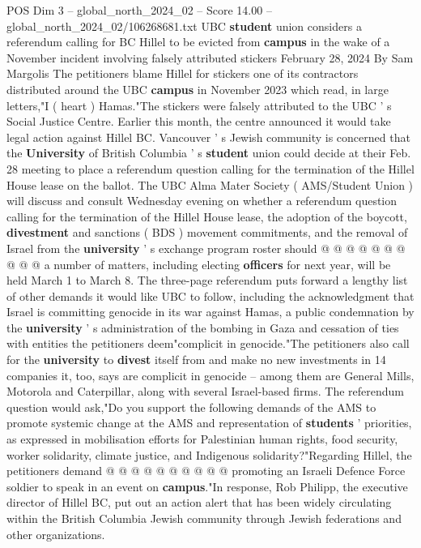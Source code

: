 \begin{textsample}{POS Dim 3 – global\_north\_2024\_02 – Score 14.00 – global\_north\_2024\_02/106268681.txt}  \label{ex:f3_pos_249}
UBC \textbf{student} union considers a referendum calling for BC Hillel to be evicted from \textbf{campus} in the wake of a November incident involving falsely attributed stickers February 28, 2024 By Sam Margolis The petitioners blame Hillel for stickers one of its contractors distributed around the UBC \textbf{campus} in November 2023 which read, in large letters,"I ( heart ) Hamas."The stickers were falsely attributed to the UBC ' s Social Justice Centre.
Earlier this month, the centre announced it would take legal action against Hillel BC.
Vancouver ' s Jewish community is concerned that the \textbf{University} of British Columbia ' s \textbf{student} union could decide at their Feb. 28 meeting to place a referendum question calling for the termination of the Hillel House lease on the ballot.
The UBC Alma Mater Society ( AMS/Student Union ) will discuss and consult Wednesday evening on whether a referendum question calling for the termination of the Hillel House lease, the adoption of the boycott, \textbf{divestment} and sanctions ( BDS ) movement commitments, and the removal of Israel from the \textbf{university} ' s exchange program roster should @ @ @ @ @ @ @ @ @ @ a number of matters, including electing \textbf{officers} for next year, will be held March 1 to March 8.
The three-page referendum puts forward a lengthy list of other demands it would like UBC to follow, including the acknowledgment that Israel is committing genocide in its war against Hamas, a public condemnation by the \textbf{university} ' s administration of the bombing in Gaza and cessation of ties with entities the petitioners deem"complicit in genocide."The petitioners also call for the \textbf{university} to \textbf{divest} itself from and make no new investments in 14 companies it, too, says are complicit in genocide -- among them are General Mills, Motorola and Caterpillar, along with several Israel-based firms.
The referendum question would ask,"Do you support the following demands of the AMS to promote systemic change at the AMS and representation of \textbf{students} ' priorities, as expressed in mobilisation efforts for Palestinian human rights, food security, worker solidarity, climate justice, and Indigenous solidarity?"Regarding Hillel, the petitioners demand @ @ @ @ @ @ @ @ @ @ promoting an Israeli Defence Force soldier to speak in an event on \textbf{campus}."In response, Rob Philipp, the executive director of Hillel BC, put out an action alert that has been widely circulating within the British Columbia Jewish community through Jewish federations and other organizations.

\end{textsample}
